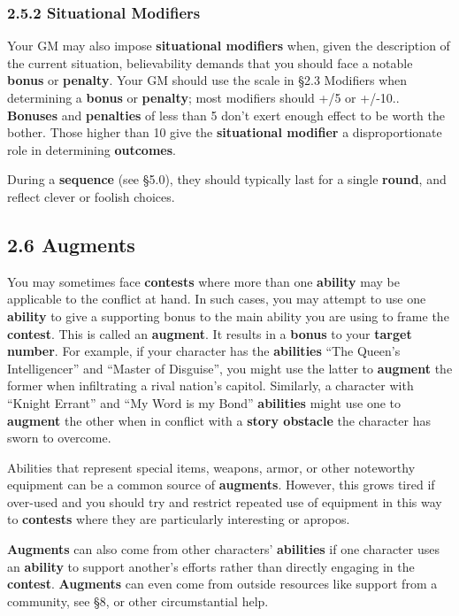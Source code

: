 \documentclass[
  11pt,
]{article}
\begin{document}
\hypertarget{situational-modifiers}{%
\subsubsection{2.5.2 Situational
Modifiers}\label{situational-modifiers}}

Your GM may also impose \textbf{situational modifiers} when, given the
description of the current situation, believability demands that you
should face a notable \textbf{bonus} or \textbf{penalty}. Your GM should
use the scale in §2.3 Modifiers when determining a \textbf{bonus} or
\textbf{penalty}; most modifiers should +/5 or +/-10.. \textbf{Bonuses}
and \textbf{penalties} of less than 5 don't exert enough effect to be
worth the bother. Those higher than 10 give the \textbf{situational
modifier} a disproportionate role in determining \textbf{outcomes}.

During a \textbf{sequence} (see §5.0), they should typically last for a
single \textbf{round}, and reflect clever or foolish choices.

\hypertarget{augments}{%
\subsection{2.6 Augments}\label{augments}}

You may sometimes face \textbf{contests} where more than one
\textbf{ability} may be applicable to the conflict at hand. In such
cases, you may attempt to use one \textbf{ability} to give a supporting
bonus to the main ability you are using to frame the \textbf{contest}.
This is called an \textbf{augment}. It results in a \textbf{bonus} to
your \textbf{target number}. For example, if your character has the
\textbf{abilities} ``The Queen's Intelligencer'' and ``Master of
Disguise'', you might use the latter to \textbf{augment} the former when
infiltrating a rival nation's capitol. Similarly, a character with
``Knight Errant'' and ``My Word is my Bond'' \textbf{abilities} might
use one to \textbf{augment} the other when in conflict with a
\textbf{story obstacle} the character has sworn to overcome.

Abilities that represent special items, weapons, armor, or other
noteworthy equipment can be a common source of \textbf{augments}.
However, this grows tired if over-used and you should try and restrict
repeated use of equipment in this way to \textbf{contests} where they
are particularly interesting or apropos.

\textbf{Augments} can also come from other characters'
\textbf{abilities} if one character uses an \textbf{ability} to support
another's efforts rather than directly engaging in the \textbf{contest}.
\textbf{Augments} can even come from outside resources like support from
a community, see §8, or other circumstantial help.
\end{document}
